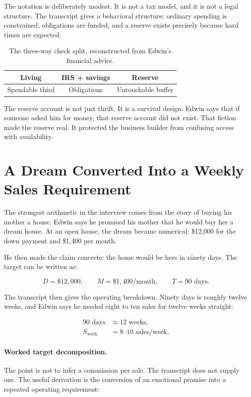 The notation is deliberately modest. It is not a tax model, and it is not a legal structure. The transcript gives a behavioral structure: ordinary spending is constrained, obligations are funded, and a reserve exists precisely because hard times are expected.

\begin{table}
\centering
\begin{tabular}{|c|c|c|}
\hline
Living & IRS + savings & Reserve \\
\hline
Spendable third & Obligations & Untouchable buffer \\
\hline
\end{tabular}
\caption{The three-way check split, reconstructed from Edwin's financial advice.}
\end{table}

The reserve account is not just thrift. It is a survival design. Edwin says that if someone asked him for money, that reserve account did not exist. That fiction made the reserve real. It protected the business builder from confusing access with availability.

\section{A Dream Converted Into a Weekly Sales Requirement}

The strongest arithmetic in the interview comes from the story of buying his mother a house. Edwin says he promised his mother that he would buy her a dream house. At an open house, the dream became numerical: \$12,000 for the down payment and \$1,400 per month.

He then made the claim concrete: the home would be hers in ninety days. The target can be written as:

\begin{equation}
D=\$12{,}000,
\qquad
M=\$1{,}400/\text{month},
\qquad
T=90\text{ days}.
\end{equation}

The transcript then gives the operating breakdown. Ninety days is roughly twelve weeks, and Edwin says he needed eight to ten sales for twelve weeks straight:

\begin{align}
90\text{ days} &\approx 12\text{ weeks},\\
S_{\text{week}} &= 8\text{--}10\text{ sales/week}.
\end{align}

\paragraph{Worked target decomposition.}
The point is not to infer a commission per sale. The transcript does not supply one. The useful derivation is the conversion of an emotional promise into a repeated operating requirement:

